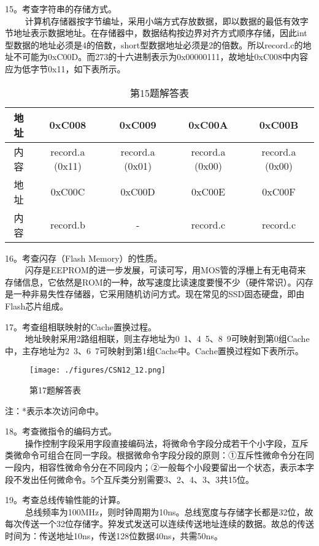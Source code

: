 15。考查字符串的存储方式。\\
$\qquad$ 计算机存储器按字节编址，采用小端方式存放数据，即以数据的最低有效字节地址表示数据地址。在存储器中，数据结构按边界对齐方式顺序存储，因此int型数据的地址必须是4的倍数，short型数据地址必须是2的倍数。所以record.c的地址不可能为0xC00D。而273的十六进制表示为0x00000111，故地址0xC008中内容应为低字节0x11，如下表所示。
\begin{table}[ht]
\centering
\caption{第15题解答表}\label{CSN12_tab6}
\begin{tabular}{|c|c|c|c|c|}
\hline
地址 & 0xC008 & 0xC009 & 0xC00A & 0xC00B \\
\hline
内容 & record.a (0x11) & record.a (0x01) & record.a (0x00) & record.a (0x00) \\
\hline
地址 & 0xC00C & 0xC00D & 0xC00E & 0xC00F \\
\hline
内容 & record.b & - & record.c & record.c \\
\hline
\end{tabular}
\end{table}

16。考查闪存（Flash Memory）的性质。\\
$\qquad$ 闪存是EEPROM的进一步发展，可读可写，用MOS管的浮栅上有无电荷来存储信息，它依然是ROM的一种，故写速度比读速度要慢不少（硬件常识）。闪存是一种非易失性存储器，它采用随机访问方式。现在常见的SSD固态硬盘，即由Flash芯片组成。

17。考查组相联映射的Cache置换过程。\\
$\qquad$ 地址映射采用2路组相联，则主存地址为0~1、4~5、8~9可映射到第0组Cache中，主存地址为2~3、6~7可映射到第1组Cache中。Cache置换过程如下表所示。
\begin{figure}[ht]
\centering
\texttt{[image: ./figures/CSN12\_12.png]}
\caption{第17题解答表} \label{CSN12_fig12}
\end{figure}
注：*表示本次访问命中。

18。考查微指令的编码方式。\\
$\qquad$ 操作控制字段采用字段直接编码法，将微命令字段分成若干个小字段，互斥类微命令可组合在同一字段。根据微命令字段分段的原则：①互斥性微命令分在同一段内，相容性微命令分在不同段内；②一般每个小段要留出一个状态，表示本字段不发出任何微命令。5个互斥类分别需要3、2、4、3、3共15位。

19。考查总线传输性能的计算。\\
$\qquad$ 总线频率为100MHz，则时钟周期为10ns。总线宽度与存储字长都是32位，故每次传送一个32位存储字。猝发式发送可以连续传送地址连续的数据。故总的传送时间为：传送地址10ns，传送128位数据40ns，共需50ns。

